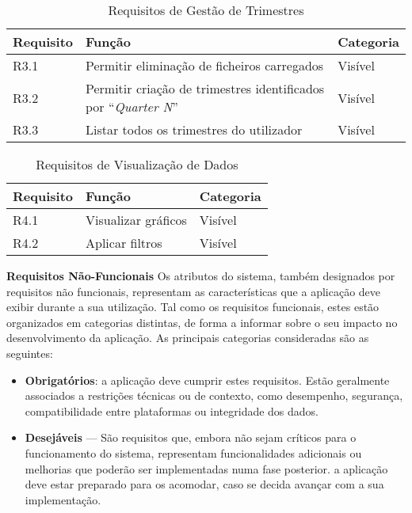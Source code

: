 \begin{table}[H]
\centering
\begin{tabular}{|l|p{7cm}|l|}
\hline
\textbf{Requisito} & \textbf{Função} & \textbf{Categoria} \\
\hline
R3.1 & Permitir eliminação de ficheiros carregados & Visível \\
R3.2 & Permitir criação de trimestres identificados por ``\textit{Quarter N}'' & Visível \\
R3.3 & Listar todos os trimestres do utilizador & Visível \\
\hline
\end{tabular}
\caption{Requisitos de Gestão de Trimestres}
\label{tab:requisitosTrimestres}
\end{table}

\begin{table}[H]
\centering
\begin{tabular}{|l|p{7cm}|l|}
\hline
\textbf{Requisito} & \textbf{Função} & \textbf{Categoria} \\
\hline
R4.1 & Visualizar gráficos & Visível \\
R4.2 & Aplicar filtros & Visível \\
\hline
\end{tabular}
\caption{Requisitos de Visualização de Dados}
\label{tab:requisitosVisualizacao}
\end{table}

\textbf{Requisitos Não-Funcionais}
Os atributos do sistema, também designados por requisitos não funcionais, representam as características que a aplicação deve exibir durante a sua utilização. Tal como os requisitos funcionais, estes estão organizados em categorias distintas, de forma a informar sobre o seu impacto no desenvolvimento da aplicação. As principais categorias consideradas são as seguintes:

\begin{itemize}
\item \textbf{Obrigatórios}: a aplicação deve cumprir estes requisitos. Estão geralmente associados a restrições técnicas ou de contexto, como desempenho, segurança, compatibilidade entre plataformas ou integridade dos dados.

\item \textbf{Desejáveis} — São requisitos que, embora não sejam críticos para o funcionamento do sistema, representam funcionalidades adicionais ou melhorias que poderão ser implementadas numa fase posterior. a aplicação deve estar preparado para os acomodar, caso se decida avançar com a sua implementação.
\end{itemize}

